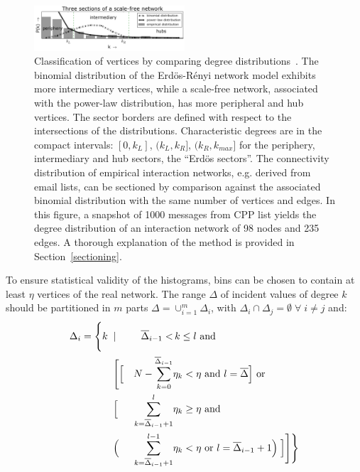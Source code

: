 \documentclass[%
aip,
jmp,%
amsmath,amssymb,
reprint,%
]{revtex4-1}
\begin{document}
\clearpage
\begin{figure}[!h]
\centering
\includegraphics[width=0.5\textwidth]{figs/fser__}
\caption{Classification of vertices by comparing degree
distributions~\cite{3setores}.
The binomial distribution of the Erd\"os-R\'enyi network model exhibits more intermediary vertices, while a scale-free network, associated with the power-law distribution, has more peripheral and hub vertices. The sector borders are defined with respect to the intersections of the distributions. Characteristic degrees are in the compact intervals: $[0,k_L]$, $(k_L,k_R]$, $(k_R,k_{max}]$ for the periphery, intermediary and hub sectors, the ``Erd\"os sectors''.
The connectivity distribution of empirical interaction networks, e.g. derived from email lists, can be sectioned by comparison against the associated binomial distribution with the same number of vertices and edges. In this figure, a snapshot of 1000 messages from CPP list yields the degree distribution of an interaction network of 98 nodes and 235 edges. A thorough explanation of the method is provided in Section~\ref{sectioning}.}
\label{fig:setores}
\end{figure}

To ensure statistical validity of the histograms, bins can be chosen to contain at least $\eta$ vertices of the real network.
The range $\Delta$ of incident values of degree $k$ should be partitioned in $m$ parts $\Delta=\cup_{i=1}^m \Delta_i$,
with $\Delta_i\cap \Delta_j=\emptyset \; \forall\; i \neq j$ and:
\begin{align}
\Delta_i =\Biggl\{ k\;\; & | & \overline{\Delta}_{i-1}< &\, k\leq l \text{ and }\;\;\;\;\;\;\;\;\;\;\;\;\nonumber\\
                         & \Biggl[ \Bigl[ & N - \sum_{k=0}^{\overline{\Delta}_{i-1}} & \eta_k< \eta \text{ and } l = \overline{\Delta} \Bigr] \text{ or }\\
&	\Bigl[ & \sum_{k=\overline{\Delta}_{i-1}+1}^l &  \eta_k \geq \eta \text{ and }\;\;\;\;\;\;\nonumber\\
& \Bigl( &\sum_{k=\overline{\Delta}_{i-1}+1}^{l-1} &  \eta_k < \eta \text{ or }   l=\overline{\Delta}_{i-1}+1 \Bigr) \;\Bigr] \Biggr] \Biggr\}\nonumber
\end{align}
\end{document}

